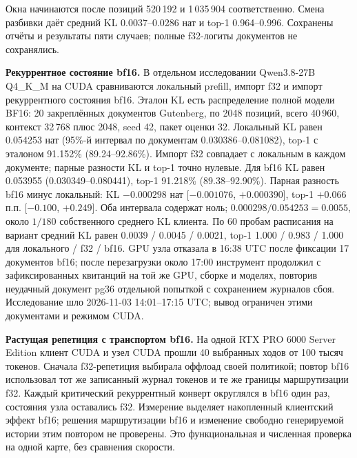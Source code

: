 Окна начинаются после позиций 520\,192 и 1\,035\,904 соответственно.
Смена разбивки даёт средний KL 0.0037--0.0286 нат и top-1 0.964--0.996.
Сохранены отчёты и результаты пяти случаев; полные f32-логиты документов не сохранялись.

\textbf{Рекуррентное состояние bf16.} В отдельном исследовании Qwen3.8-27B Q4\_K\_M
на CUDA сравниваются локальный prefill, импорт f32 и импорт рекуррентного состояния bf16.
Эталон KL есть распределение полной модели BF16: 20 закреплённых документов Gutenberg,
по 2048 позиций, всего 40\,960, контекст 32\,768 плюс 2048, seed 42, пакет оценки 32.
Локальный KL равен 0.054253 нат (95\%-й интервал по документам 0.030386--0.081082),
top-1 с эталоном 91.152\% (89.24--92.86\%). Импорт f32 совпадает с локальным в каждом документе;
парные разности KL и top-1 точно нулевые. Для bf16 KL равен 0.053955 (0.030349--0.080441),
top-1 91.218\% (89.38--92.90\%). Парная разность bf16 минус локальный:
KL $-0.000298$ нат [$-0.001076$, $+0.000390$], top-1 $+0.066$ п.п. [$-0.100$, $+0.249$].
Оба интервала содержат ноль; $0.000298/0.054253=0.0055$, около $1/180$ собственного среднего KL клиента.
По 60 пробам расписания на вариант средний KL равен 0.0039 / 0.0045 / 0.0021,
top-1 1.000 / 0.983 / 1.000 для локального / f32 / bf16.
GPU узла отказала в 16:38 UTC после фиксации 17 документов bf16; после перезагрузки около 17:00
инструмент продолжил с зафиксированных квитанций на той же GPU, сборке и моделях,
повторив неудачный документ pg36 отдельной попыткой с сохранением журналов сбоя.
Исследование шло 2026-11-03 14:01--17:15 UTC; вывод ограничен этими документами и режимом CUDA.

\textbf{Растущая репетиция с транспортом bf16.} На одной RTX PRO 6000 Server Edition
клиент CUDA и узел CUDA прошли 40 выбранных ходов от 100 тысяч токенов.
Сначала f32-репетиция выбирала оффлоад своей политикой; повтор bf16 использовал тот же записанный журнал токенов
и те же границы маршрутизации f32. Каждый критический рекуррентный конверт округлялся в bf16 один раз,
состояния узла оставались f32. Измерение выделяет накопленный клиентский эффект bf16;
решения маршрутизации bf16 и изменение свободно генерируемой истории этим повтором не проверены.
Это функциональная и численная проверка на одной карте, без сравнения скорости.

